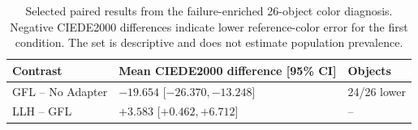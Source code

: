 \documentclass[times,twocolumn,final]{elsarticle}
\providecommand{\DIFaddbegin}{} %
\providecommand{\DIFaddend}{} %
\providecommand{\DIFdelbegin}{} %
\providecommand{\DIFdelend}{} %
\begin{document}
\DIFdelbegin %
\DIFdelend \DIFaddbegin \begin{table}[t]
\centering
\scriptsize
\setlength{\tabcolsep}{3pt}
\caption{Selected paired results from the failure-enriched 26-object color diagnosis. Negative CIEDE2000 differences indicate lower reference-color error for the first condition. The set is descriptive and does not estimate population prevalence.}
\label{tab:color-summary}
\begin{tabular}{p{2.3cm}p{3.3cm}p{1.3cm}}
\toprule
Contrast & Mean CIEDE2000 difference [95\% CI] & Objects \\
\midrule
GFL -- No Adapter & $-19.654$ [$-26.370,-13.248$] & 24/26 lower \\
LLH -- GFL & $+3.583$ [$+0.462,+6.712$] & -- \\
\bottomrule
\end{tabular}
\end{table}
\DIFaddend 
\end{document}
